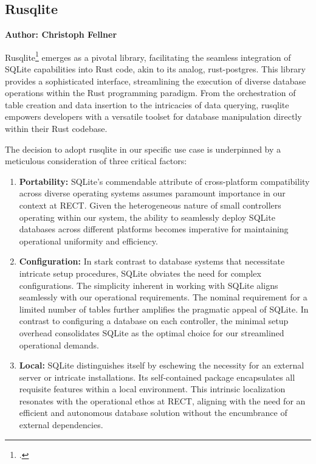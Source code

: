 \subsection{Rusqlite}
\textbf{Author: Christoph Fellner}

Rusqlite\footcite{rusqlite} emerges as a pivotal library, facilitating the seamless integration of SQLite capabilities into Rust code, akin to its analog, 
rust-postgres. This library provides a sophisticated interface, streamlining the execution of diverse database operations within the Rust programming paradigm. 
From the orchestration of table creation and data insertion to the intricacies of data querying, rusqlite empowers developers with a versatile toolset for 
database manipulation directly within their Rust codebase.

The decision to adopt rusqlite in our specific use case is underpinned by a meticulous consideration of three critical factors:

\begin{enumerate}
    \item \textbf{Portability:} SQLite's commendable attribute of cross-platform compatibility across diverse operating systems assumes paramount importance in 
    our context at RECT. Given the heterogeneous nature of small controllers operating within our system, the ability to seamlessly deploy SQLite databases 
    across different platforms becomes imperative for maintaining operational uniformity and efficiency.
    
    \item \textbf{Configuration:} In stark contrast to database systems that necessitate intricate setup procedures, SQLite obviates the need for complex 
    configurations. The simplicity inherent in working with SQLite aligns seamlessly with our operational requirements. The nominal requirement for a limited 
    number of tables further amplifies the pragmatic appeal of SQLite. In contrast to configuring a database on each controller, the minimal setup overhead 
    consolidates SQLite as the optimal choice for our streamlined operational demands.
    
    \item \textbf{Local:} SQLite distinguishes itself by eschewing the necessity for an external server or intricate installations. Its self-contained package 
    encapsulates all requisite features within a local environment. This intrinsic localization resonates with the operational ethos at RECT, aligning with the 
    need for an efficient and autonomous database solution without the encumbrance of external dependencies.
\end{enumerate}

